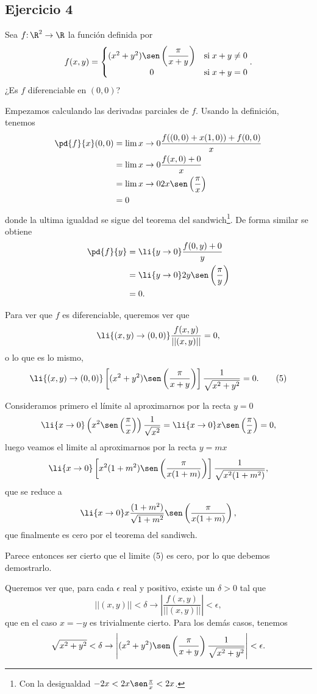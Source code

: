 \subsection*{Ejercicio 4}
	Sea $f\mathpunct{:} \R^2 \to \R$ la función definida por
\[
f(x,y)= \begin{cases}
(x^2+y^2)\sen\left(\dfrac{\pi}{x+y}\right)  &\text{si} \; x+y \neq 0 \\
\hfill 0 \hfill  &\text{si} \; x+y = 0
\end{cases}.
\]
¿Es $f$ diferenciable en $(0,0)$?
\begin{sol}
	Empezamos calculando las derivadas parciales de $f$. Usando la definición, tenemos
	\begin{align*} 
	\pd{f}{x}(0,0) &= \lim{x\to 0} \frac{f((0,0) + x(1,0)) + f(0,0)}{x} \\
	&= \lim{x\to 0} \frac{f(x,0) + 0}{x} \\
	&= \lim{x\to 0} 2x\sen\left(\frac{\pi}{x} \right) \\
	&= 0
	\end{align*}
	donde la ultima igualdad se sigue del teorema del sandwich\footnote{Con la desigualdad $-2x<2x\sen\frac{\pi}{x}<2x$.}. De forma similar se obtiene
	\begin{align*}
	\pd{f}{y} &= \li{y\to 0} \frac{f(0,y) + 0}{y} \\
	&= \li{y\to 0} 2y\sen\left(\frac{\pi}{y} \right) \\
	&= 0.
	\end{align*}
	
	Para ver que $f$ es diferenciable, queremos ver que 
	\[ \li{(x,y)\to (0,0)} \frac{f(x,y)}{||(x,y)||} = 0, \]
	o lo que es lo mismo,
	\[ \li{(x,y)\to (0,0)} \left[ (x^2+y^2)\sen\left(\frac{\pi}{x+y} \right) \right] \frac{1}{\sqrt{x^2+y^2}} = 0. \tag{5} \]
	
	Consideramos primero el límite al aproximarnos por la recta $y=0$
	\[ \li{x\to 0} \left( x^2 \sen\left( \frac{\pi}{x} \right) \right) \frac{1}{\sqrt{x^2}} = \li{x\to 0} x\sen\left(\frac{\pi}{x}\right) = 0, \]
	luego veamos el limite al aproximarnos por la recta $y=mx$
	\[ \li{x\to 0} \left[ x^2(1+m^2) \sen\left(\frac{\pi}{x(1+m)} \right) \right] \frac{1}{\sqrt{x^2(1+m^2)}}, \]
	que se reduce a
	\[ \li{x\to 0} x\frac{(1+m^2)}{\sqrt{1+m^2}} \sen\left(\frac{\pi}{x(1+m)} \right), \]
	que finalmente es cero por el teorema del sandiwch.
	
	Parece entonces ser cierto que el limite (5) es cero, por lo que debemos demostrarlo. 
	
	Queremos ver que, para cada $\epsilon$ real y positivo, existe un $\delta>0$ tal que
	\[ ||(x,y)|| < \delta \rightarrow \left|\frac{f(x,y)}{||(x,y)||}\right| < \epsilon, \]
	que en el caso $x=-y$ es trivialmente cierto. Para los demás casos, tenemos 
	\[ \sqrt{x^2+y^2} < \delta \rightarrow \left| (x^2+y^2) \sen\left(\frac{\pi}{x+y} \right)   \frac{1}{\sqrt{x^2+y^2}} \right| < \epsilon. \]
	

\end{sol}
